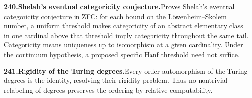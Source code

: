 \documentclass[11pt,a4paper]{article}
\begin{document}
  \par \begin{minipage}{\linewidth}
  \fontsize{10.5}{12.6}\selectfont\RaggedRight
  \hypertarget{result 240}{}
  {\bfseries\textcolor{muted}{240.}\enspace Shelah's eventual categoricity conjecture.}\enspace Proves Shelah's eventual categoricity conjecture in ZFC: for each bound on the L\"owenheim--Skolem number, a uniform threshold makes categoricity of an abstract elementary class in one cardinal above that threshold imply categoricity throughout the same tail. Categoricity means uniqueness up to isomorphism at a given cardinality. Under the continuum hypothesis, a proposed specific Hanf threshold need not suffice.\par
  \end{minipage}\par\vspace{5pt}



  \par \begin{minipage}{\linewidth}
  \fontsize{10.5}{12.6}\selectfont\RaggedRight
  \hypertarget{result 241}{}
  {\bfseries\textcolor{muted}{241.}\enspace Rigidity of the Turing degrees.}\enspace Every order automorphism of the Turing degrees is the identity, resolving their rigidity problem. Thus no nontrivial relabeling of degrees preserves the ordering by relative computability.\par
  \end{minipage}\par\vspace{5pt}
\end{document}
